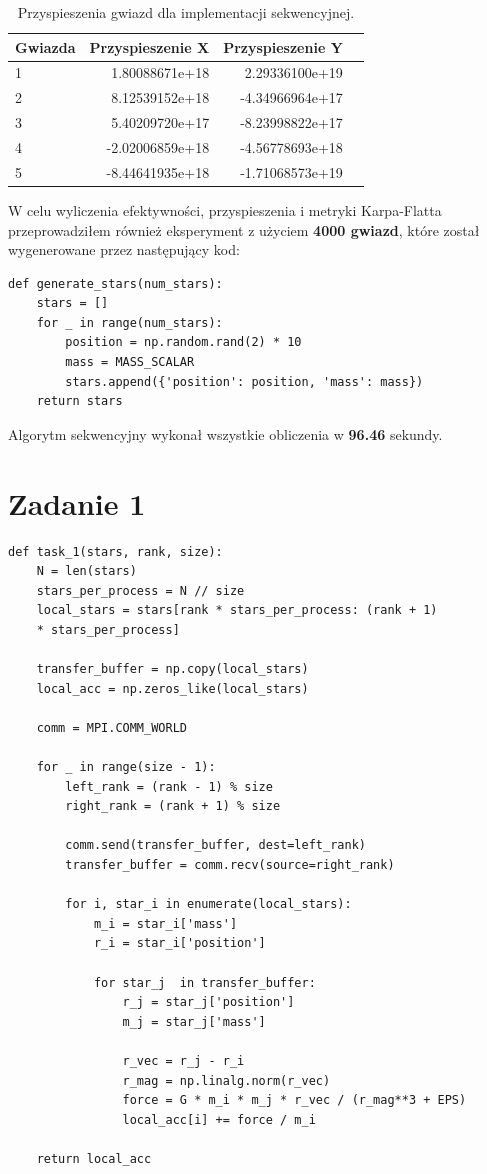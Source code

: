 \documentclass{article}
\begin{document}
\begin{table}[ht]
    \centering
    \begin{tabular}{|l|r|r|r|}
    \hline
    \rowcolor{orange!40} 
    Gwiazda & Przyspieszenie X & Przyspieszenie Y  \\\hline
    1 & 1.80088671e+18 & 2.29336100e+19 \\\hline
    2 & 8.12539152e+18 & -4.34966964e+17 \\\hline
    3 & 5.40209720e+17 & -8.23998822e+17 \\\hline
    4 & -2.02006859e+18 & -4.56778693e+18 \\\hline
    5 & -8.44641935e+18 & -1.71068573e+19 \\\hline
    \end{tabular}
    \caption{\label{tab:widgets}Przyspieszenia gwiazd dla implementacji sekwencyjnej.}
\end{table}

W celu wyliczenia efektywności, przyspieszenia i metryki Karpa-Flatta przeprowadziłem również eksperyment z użyciem \textbf{4000 gwiazd}, które został wygenerowane przez następujący kod:

\begin{lstlisting}
def generate_stars(num_stars):
    stars = []
    for _ in range(num_stars):
        position = np.random.rand(2) * 10  
        mass = MASS_SCALAR 
        stars.append({'position': position, 'mass': mass})
    return stars
\end{lstlisting}

Algorytm sekwencyjny wykonał wszystkie obliczenia w \textbf{96.46} sekundy.

\section{Zadanie 1}
\begin{lstlisting}
def task_1(stars, rank, size):
    N = len(stars)
    stars_per_process = N // size
    local_stars = stars[rank * stars_per_process: (rank + 1) 
    * stars_per_process]

    transfer_buffer = np.copy(local_stars)
    local_acc = np.zeros_like(local_stars)

    comm = MPI.COMM_WORLD

    for _ in range(size - 1):
        left_rank = (rank - 1) % size
        right_rank = (rank + 1) % size

        comm.send(transfer_buffer, dest=left_rank)
        transfer_buffer = comm.recv(source=right_rank)

        for i, star_i in enumerate(local_stars):
            m_i = star_i['mass']
            r_i = star_i['position']

            for star_j  in transfer_buffer:
                r_j = star_j['position']
                m_j = star_j['mass']

                r_vec = r_j - r_i
                r_mag = np.linalg.norm(r_vec)
                force = G * m_i * m_j * r_vec / (r_mag**3 + EPS)
                local_acc[i] += force / m_i

    return local_acc

\end{lstlisting}
\end{document}
